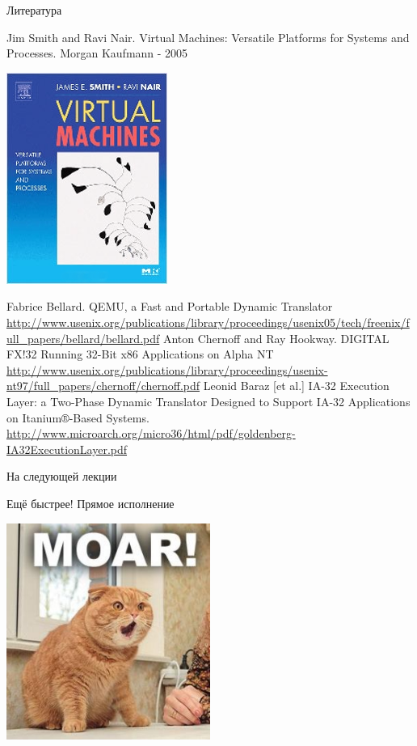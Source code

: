 \documentclass{beamer}
\begin{document}
\begin{frame}[allowframebreaks]{Литература}
\begin{thebibliography}{99}
     Jim Smith and Ravi Nair. Virtual Machines: Versatile Platforms for Systems and Processes. Morgan Kaufmann - 2005
    \begin{center}
    \includegraphics[height=0.5\textheight]{./vm-book}
    \end{center}
    
     Fabrice Bellard. QEMU, a Fast and Portable Dynamic Translator \url{http://www.usenix.org/publications/library/proceedings/usenix05/tech/freenix/full_papers/bellard/bellard.pdf}
     Anton Chernoff and Ray Hookway. {DIGITAL FX!32} Running 32-Bit x86 Applications on {Alpha} {NT} \url{http://www.usenix.org/publications/library/proceedings/usenix-nt97/full_papers/chernoff/chernoff.pdf}
     Leonid Baraz [et al.] IA-32 Execution Layer: a Two-Phase Dynamic Translator Designed to Support IA-32 Applications on Itanium®-Based Systems. \url{http://www.microarch.org/micro36/html/pdf/goldenberg-IA32ExecutionLayer.pdf}
\end{thebibliography}
\end{frame}


\begin{frame}{На следующей лекции}
\centering

Ещё быстрее! Прямое исполнение
\vfill

\includegraphics[width=0.5\textwidth]{./moar}
\end{frame}
\end{document}
